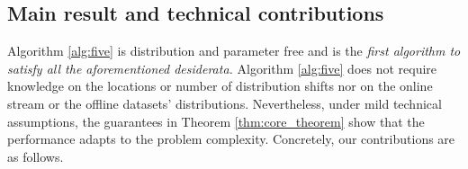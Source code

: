 


\subsection{Main result and technical contributions}

{Algorithm \ref{alg:five} is distribution and parameter free and is the \emph{first algorithm to satisfy all the aforementioned desiderata.}}  Algorithm \ref{alg:five} does not require knowledge on the locations or number of distribution shifts nor on the online stream or the offline datasets' distributions. Nevertheless, under mild technical assumptions, the guarantees in Theorem \ref{thm:core_theorem} show that the performance adapts to the problem complexity.
Concretely, our contributions are as follows.


